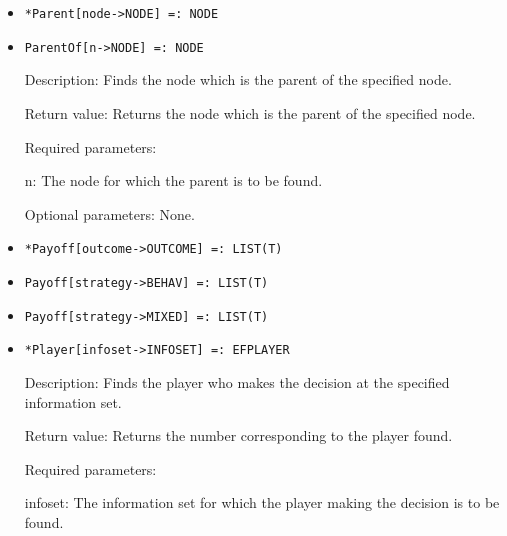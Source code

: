 \begin{itemize}
\item
\protect \large \begin{verbatim}
*Parent[node->NODE] =: NODE
\end{verbatim}\normalsize

\item
\protect \large \begin{verbatim}
ParentOf[n->NODE] =: NODE
\end{verbatim}\normalsize

\bd
\item
[Description:] Finds the node which is the parent of the specified
node.
\item
[Return value:] Returns the node which is the parent of the specified
node.
\item
[Required parameters:]\hfil\null
	
\bd
\item
[n:] The node for which the parent is to be found.
\ed

\item
[Optional parameters:] None.
\ed

\item
\protect \large \begin{verbatim}
*Payoff[outcome->OUTCOME] =: LIST(T)
\end{verbatim}\normalsize

\item
\protect \large \begin{verbatim}
Payoff[strategy->BEHAV] =: LIST(T)
\end{verbatim}\normalsize

\item
\protect \large \begin{verbatim}
Payoff[strategy->MIXED] =: LIST(T)
\end{verbatim}\normalsize

\item
\protect \large \begin{verbatim}
*Player[infoset->INFOSET] =: EFPLAYER
\end{verbatim}\normalsize

\bd
\item
[Description:] Finds the player who makes the decision at the
specified information set.
\item
[Return value:] Returns the number corresponding to the player found.
\item
[Required parameters:]\hfil\null

\bd
\item
[infoset:] The information set for which the player making the
decision is to be found.
\ed


\end{itemize}
